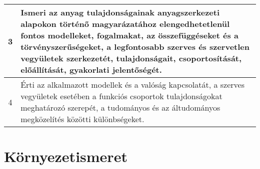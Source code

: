 \begin{longtable}{c | p{} }
                                
                                          3 &  Ismeri az anyag tulajdonságainak anyagszerkezeti alapokon történő magyarázatához elengedhetetlenül fontos modelleket, fogalmakat, az összefüggéseket és a törvényszerűségeket, a legfontosabb szerves és szervetlen vegyületek szerkezetét, tulajdonságait, csoportosítását, előállítását, gyakorlati jelentőségét. \\ \hline
                                      
                                
                                          4 &  Érti az alkalmazott modellek és a valóság kapcsolatát, a szerves vegyületek esetében a funkciós csoportok tulajdonságokat meghatározó szerepét, a tudományos és az áltudományos megközelítés közötti különbségeket. \\ \hline
                                      
                        \end{longtable}
            \clearpage

        \section{Környezetismeret}

